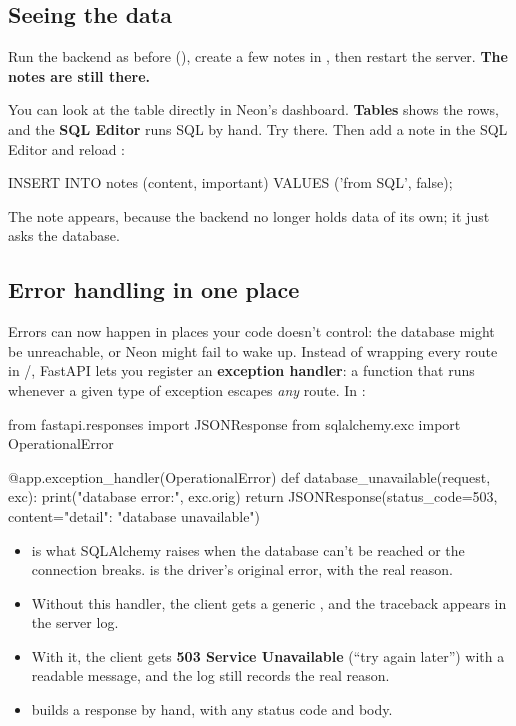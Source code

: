 \subsection{Seeing the data}

Run the backend as before (), create a few notes in , then restart the server. \textbf{The notes are still there.}

You can look at the table directly in Neon's dashboard. \textbf{Tables} shows the rows, and the \textbf{SQL Editor} runs SQL by hand. Try  there. Then add a note in the SQL Editor and reload :

\begin{code}
INSERT INTO notes (content, important) VALUES ('from SQL', false);
\end{code}

The note appears, because the backend no longer holds data of its own; it just asks the database.

\subsection{Error handling in one place}

Errors can now happen in places your code doesn't control: the database might be unreachable, or Neon might fail to wake up. Instead of wrapping every route in /, FastAPI lets you register an \textbf{exception handler}: a function that runs whenever a given type of exception escapes \emph{any} route. In :

\begin{py}
from fastapi.responses import JSONResponse
from sqlalchemy.exc import OperationalError


@app.exception_handler(OperationalError)
def database_unavailable(request, exc):
	print("database error:", exc.orig)
	return JSONResponse(status_code=503, content={"detail": "database unavailable"})
\end{py}

\begin{itemize}
\item {} is what SQLAlchemy raises when the database can't be reached or the connection breaks.  is the driver's original error, with the real reason.
\item Without this handler, the client gets a generic , and the traceback appears in the server log.
\item With it, the client gets \textbf{503 Service Unavailable} (``try again later'') with a readable message, and the log still records the real reason.
\item {} builds a response by hand, with any status code and body.
\end{itemize}

